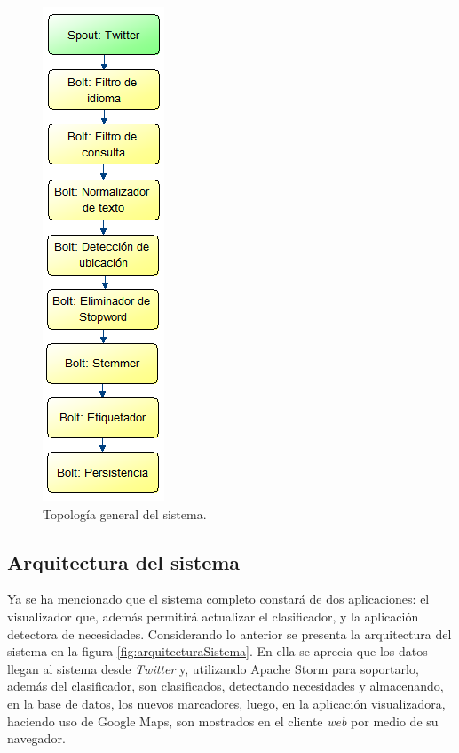 \begin{figure}[H]
	\centering
	\captionsetup{justification=centering}
	\includegraphics[scale=0.8]{images/TopologiaGeneral.png}
	\caption[Topología general del sistema.]{Topología general del sistema.}
	\label{fig:TopologiaGeneral}
\end{figure}

\subsection{Arquitectura del sistema}
\label{subsec:Arquitectura}

Ya se ha mencionado que el sistema completo constará de dos aplicaciones: el visualizador que, además permitirá actualizar el clasificador, y la aplicación detectora de necesidades. Considerando lo anterior se presenta la arquitectura del sistema en la figura \ref{fig:arquitecturaSistema}. En ella se aprecia que los datos llegan al sistema desde \textit{Twitter} y, utilizando Apache Storm para soportarlo, además del clasificador, son clasificados, detectando necesidades y almacenando, en la base de datos, los nuevos marcadores, luego, en la aplicación visualizadora, haciendo uso de Google Maps, son mostrados en el cliente \textit{web} por medio de su navegador.

